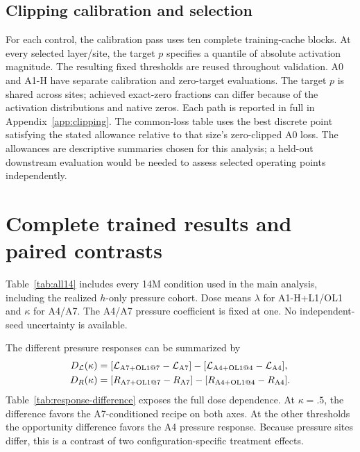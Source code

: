 \subsection{Clipping calibration and selection}
For each control, the calibration pass uses ten complete training-cache
blocks. At every selected layer/site, the target $p$ specifies a quantile of
absolute activation magnitude. The resulting fixed thresholds are reused
throughout validation. A0 and A1-H have separate calibration and zero-target
evaluations. The target $p$ is shared across sites; achieved exact-zero
fractions can differ because of the activation distributions and native
zeros. Each path is reported in full in Appendix~\ref{app:clipping}.
The common-loss table uses the best discrete point satisfying the stated
allowance relative to that size's zero-clipped A0 loss. The allowances are
descriptive summaries chosen for this analysis; a held-out downstream
evaluation would be needed to assess selected operating points independently.

\clearpage
\section{Complete trained results and paired contrasts}
\label{app:full-results}
Table~\ref{tab:all14} includes every 14M condition used in the main analysis,
including the realized $h$-only pressure cohort.
Dose means $\lambda$ for A1-H+L1/OL1 and $\kappa$ for A4/A7.
The A4/A7 pressure coefficient is fixed at one.
No independent-seed uncertainty is available.

\begin{table}[h]
\centering
\caption{Complete 14M training grid. Loss and opportunity are paired in the
same complete-validation counting pass.}
\label{tab:all14}
\small

\end{table}

\clearpage
\begin{table}[t]
\centering
\caption{Complete selected 70M training grid. The 70M study repeats the
pressured recipes; it has no unpressured A4/A7 or $h$-only-pressure branches.}
\label{tab:all70}
\small

\end{table}

The different pressure responses can be summarized by
\begin{align}
 D_{\mathcal L}(\kappa)
 &= [\mathcal L_{\rm A7+OL1@7}-\mathcal L_{\rm A7}]
   -[\mathcal L_{\rm A4+OL1@4}-\mathcal L_{\rm A4}],\\
 D_R(\kappa)
 &= [R_{\rm A7+OL1@7}-R_{\rm A7}]
   -[R_{\rm A4+OL1@4}-R_{\rm A4}].
\end{align}
Table~\ref{tab:response-difference} exposes the full dose dependence.
At $\kappa=.5$, the difference favors the A7-conditioned recipe on both
axes. At the other thresholds the opportunity difference favors the A4
pressure response. Because pressure sites differ, this is a contrast of
two configuration-specific treatment effects.

